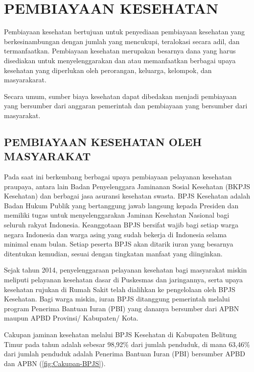 \chapter{PEMBIAYAAN KESEHATAN}
Pembiayaan kesehatan bertujuan untuk penyediaan pembiayaan kesehatan yang berkesinambungan dengan jumlah yang mencukupi, teralokasi secara adil, dan termanfaatkan. Pembiayaan kesehatan merupakan besarnya dana yang harus disediakan untuk menyelenggarakan dan atau memanfaatkan berbagai upaya kesehatan yang diperlukan oleh perorangan, keluarga, kelompok, dan masyarakarat.

Secara umum, sumber biaya kesehatan dapat dibedakan menjadi pembiayaan yang bersumber dari anggaran pemerintah dan pembiayaan yang bersumber dari masyarakat.

\section[PEMBIAYAAN OLEH MASYARAKAT]{PEMBIAYAAN KESEHATAN OLEH MASYARAKAT}
Pada saat ini berkembang berbagai upaya pembiayaan pelayanan kesehatan praupaya, antara lain Badan Penyelenggara Jaminanan Sosial Kesehatan (BKPJS Kesehatan) dan berbagai jasa asuransi kesehatan swasta. BPJS Kesehatan adalah Badan Hukum Publik yang bertanggung jawab langsung kepada Presiden dan memiliki tugas untuk menyelenggarakan Jaminan Kesehatan Nasional bagi seluruh rakyat Indonesia. Keanggotaan BPJS bersifat wajib bagi setiap warga negara Indonesia dan warga asing yang sudah bekerja di Indonesia selama minimal enam bulan. Setiap peserta BPJS akan ditarik iuran yang besarnya ditentukan kemudian, sesuai dengan tingkatan manfaat yang diinginkan.

Sejak tahun 2014, penyelenggaraan pelayanan kesehatan bagi masyarakat miskin meliputi pelayanan kesehatan dasar di Puskesmas dan jaringannya, serta upaya kesehatan rujukan di Rumah Sakit telah dialihkan ke pengelolaan oleh BPJS Kesehatan. Bagi warga miskin, iuran BPJS ditanggung pemerintah melalui program Penerima Bantuan Iuran (PBI) yang dananya bersumber dari APBN maupun APBD Provinsi/ Kabupaten/ Kota.

Cakupan jaminan kesehatan melalui BPJS Kesehatan di Kabupaten Belitung Timur pada tahun \tP adalah sebesar 98,92\% dari jumlah penduduk, di mana 63,46\%  dari jumlah penduduk adalah Penerima Bantuan Iuran (PBI) bersumber APBD dan APBN (\autoref{fig:Cakupan-BPJS}).

